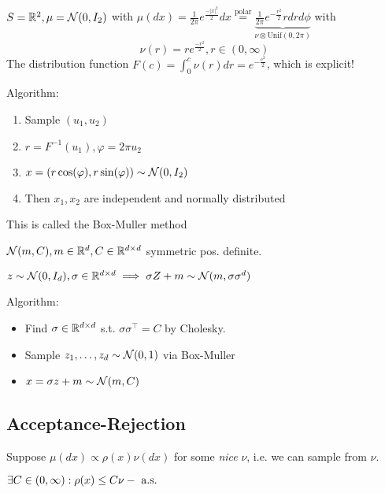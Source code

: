 \begin{example}
   \(S=\mathbb{R}^2,\mu=\mathcal{N}(0,I_2)\) with \(\mu(dx)=\frac{1}{2\pi}e^{\frac{-|x|^2}{2}}dx \stackrel{\text{polar}}{=}\underbrace{\frac{1}{2\pi}e^{-\frac{r^2}{2}}rdrd\phi}_{\nu\otimes \text{Unif}(0,2\pi)}\)
    with \[\nu(r)=re^{\frac{-r^2}{2}},r\in(0,\infty)\]
    The distribution function \(F(c)=\int_0^c \nu(r)dr = e^{-\frac{c^2}{2}}\), which is explicit!
    
    Algorithm:
    \begin{enumerate}
        \item Sample \((u_1,u_2)\)
        \item \(r=F^{-1}(u_1),\varphi=2\pi u_2\)
        \item \(x=(r\cos(\varphi),r\sin(\varphi))\sim\mathcal{N}(0,I_2)\)
        \item Then \(x_1,x_2\) are independent and normally distributed
    \end{enumerate}
    This is called the Box-Muller method
\end{example}

\begin{example}
    \(\mathcal{N}(m,C),m\in\mathbb{R}^d,C\in\mathbb{R}^{d\times d}\) symmetric pos. definite. 
\end{example}

\begin{remark}
    \(z\sim\mathcal{N}(0,I_d),\sigma\in\mathbb{R}^{d\times d}\implies \sigma Z+m\sim\mathcal{N}(m,\sigma\sigma^d)\)
\end{remark}

Algorithm:
\begin{itemize}
    \item Find \(\sigma\in\mathbb{R}^{d\times d}\) s.t. \(\sigma\sigma^\intercal=C\) by Cholesky.
    \item Sample \(z_1,\dots,z_d\sim \mathcal{N}(0,1)\) via Box-Muller 
    \item \(x=\sigma z+m\sim\mathcal{N}(m,C)\)
\end{itemize}

\subsection{Acceptance-Rejection}

Suppose \(\mu(dx)\propto\rho(x) \nu(dx)\) for some \textit{nice} \(\nu\), i.e. we can sample from \(\nu\).

 \(\exists C\in (0,\infty): \rho(x)\leq C \nu-\text{ a.s. }\)

